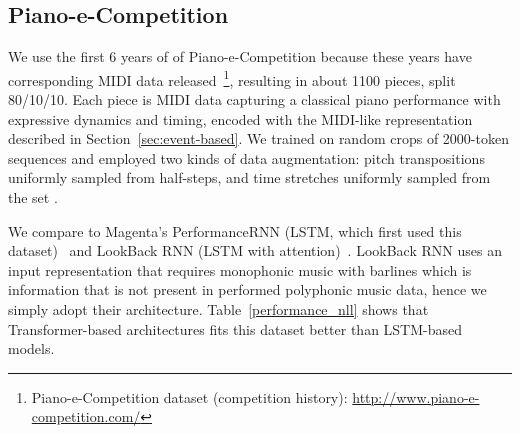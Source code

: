 \documentclass{article} \usepackage{iclr2019_conference,times}
\begin{document}
\iffalse

\fi


\subsection{Piano-e-Competition}
\label{sec:pianoecompetition}

We use the first 6 years of of Piano-e-Competition because these years have corresponding MIDI data released~\footnote{Piano-e-Competition dataset (competition history): \url{http://www.piano-e-competition.com/}}, resulting in about 1100 pieces, split 80/10/10. 
Each piece is MIDI data capturing a classical piano performance with expressive dynamics and timing, encoded with the MIDI-like representation described in Section~\ref{sec:event-based}.
We trained on random crops of 2000-token sequences and employed two kinds of data augmentation:  pitch transpositions uniformly sampled from  half-steps, and time stretches uniformly sampled from the set .

We compare to Magenta's PerformanceRNN (LSTM, which first used this dataset)~\citep{oore2018time} and LookBack RNN (LSTM with attention)~\citep{waite2016generating}. 
LookBack RNN uses an input representation that requires monophonic music with barlines which is information that is not present in performed polyphonic music data, hence we simply adopt their architecture. Table~\ref{performance_nll} shows that Transformer-based architectures fits this dataset better than LSTM-based models.  
\end{document}
